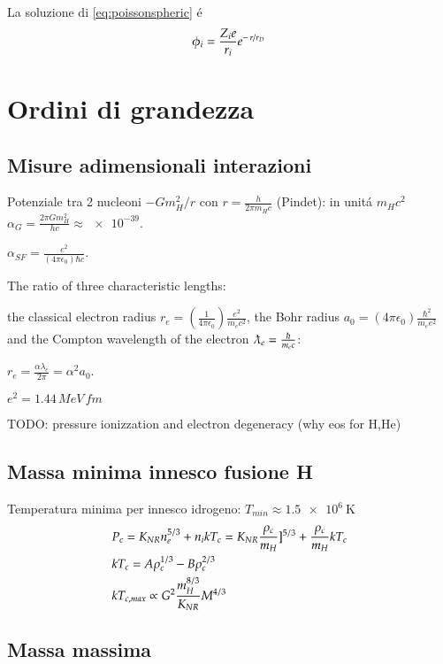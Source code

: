 La soluzione di \eqref{eq:poissonspheric} \'e
\begin{equation}\label{eq:screenedpotential}
\phi_i=\frac{Z_ie}{r_i}e^{-\left.{r}\middle/{r_D}\right.}
\end{equation}

\section{Ordini di grandezza}

\subsection{Misure adimensionali interazioni}

Potenziale tra 2 nucleoni $-Gm_H^2/r$ con $r=\frac{h}{2\pi m_Hc}$ (Pindet): in unit\'a $m_Hc^2$ $\alpha_G=\frac{2\pi Gm_H^2}{hc}\approx\num{e-39}$.

$\alpha_{SF}=\frac{e^2}{(4\pi\epsilon_0)\hbar c}$.

The ratio of three characteristic lengths:

the classical electron radius $r_e=(\frac{1}{4\pi\epsilon_0})\frac{e^2}{m_ec^2}$, the Bohr radius $a_0=(4\pi\epsilon_0)\frac{\hbar^2}{m_ee^2}$  and the Compton wavelength of the electron $\lambdabar_e=\frac{\hbar}{m_ec}$:

$r_e=\frac{\alpha\lambda_e}{2\pi}=\alpha^2a_0$.

$e^2=1.44\,MeV\,fm$

TODO: pressure ionizzation and electron degeneracy (why eos for H,He)

\subsection{Massa minima innesco fusione H}

Temperatura minima per innesco idrogeno: $T_{min}\approx\SI{1.5e6}{\kelvin}$
\begin{align*}
&P_c=K_{NR}n_e^{5/3}+n_ikT_c=K_{NR}\frac{\rho_c}{m_H}]^{5/3}+\frac{\rho_c}{m_H}kT_c\\
&kT_c=A\rho_c^{1/3}-B\rho_c^{2/3}\\
&kT_{c,max}\propto G^2\frac{m_H^{8/3}}{K_{NR}}M^{4/3}
\end{align*}

\subsection{Massa massima}


